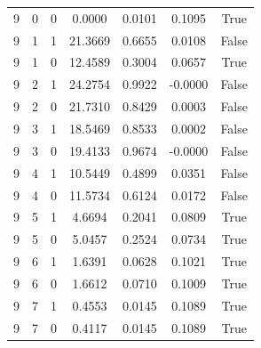 \documentclass[11pt, a4paper]{article}
\begin{document}
\begin{center}
\begin{tabular}{|c|c|c|c|c|c|c|}
9 & 0 & 0 & 0.0000 & 0.0101 & 0.1095 & True \\
9 & 1 & 1 & 21.3669 & 0.6655 & 0.0108 & False \\
9 & 1 & 0 & 12.4589 & 0.3004 & 0.0657 & True \\
9 & 2 & 1 & 24.2754 & 0.9922 & -0.0000 & False \\
9 & 2 & 0 & 21.7310 & 0.8429 & 0.0003 & False \\
9 & 3 & 1 & 18.5469 & 0.8533 & 0.0002 & False \\
9 & 3 & 0 & 19.4133 & 0.9674 & -0.0000 & False \\
9 & 4 & 1 & 10.5449 & 0.4899 & 0.0351 & False \\
9 & 4 & 0 & 11.5734 & 0.6124 & 0.0172 & False \\
9 & 5 & 1 & 4.6694 & 0.2041 & 0.0809 & True \\
9 & 5 & 0 & 5.0457 & 0.2524 & 0.0734 & True \\
9 & 6 & 1 & 1.6391 & 0.0628 & 0.1021 & True \\
9 & 6 & 0 & 1.6612 & 0.0710 & 0.1009 & True \\
9 & 7 & 1 & 0.4553 & 0.0145 & 0.1089 & True \\
9 & 7 & 0 & 0.4117 & 0.0145 & 0.1089 & True \\  
\hline
    
    
    
    \end{tabular}
    
\end{center}



%
%
\end{document}
